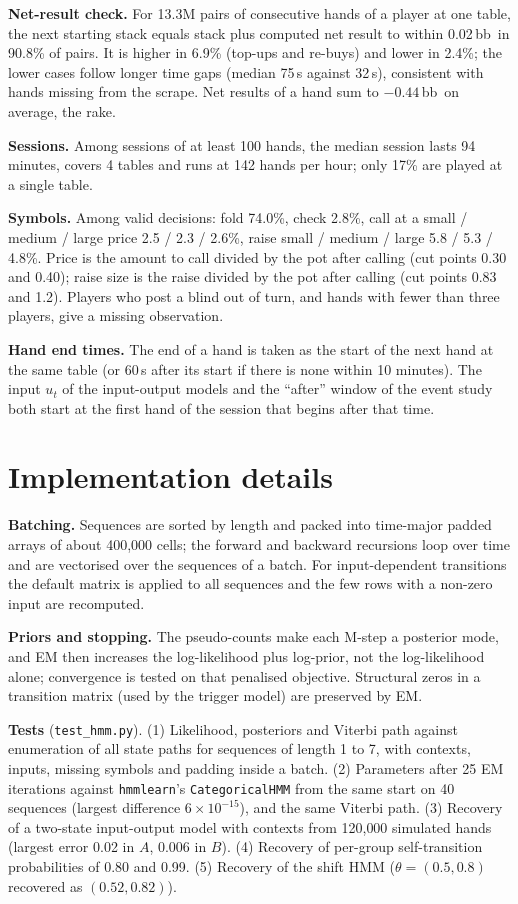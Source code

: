 \documentclass{article}
\newcommand{\bb}{\,bb}
\begin{document}
\textbf{Net-result check.} For 13.3M pairs of consecutive hands of a player at one table, the next starting stack equals stack plus computed net result to within 0.02\bb\ in 90.8\% of pairs. It is higher in 6.9\% (top-ups and re-buys) and lower in 2.4\%; the lower cases follow longer time gaps (median 75\,s against 32\,s), consistent with hands missing from the scrape. Net results of a hand sum to $-0.44$\bb\ on average, the rake.

\textbf{Sessions.} Among sessions of at least 100 hands, the median session lasts 94 minutes, covers 4 tables and runs at 142 hands per hour; only 17\% are played at a single table.

\textbf{Symbols.} Among valid decisions: fold 74.0\%, check 2.8\%, call at a small / medium / large price 2.5 / 2.3 / 2.6\%, raise small / medium / large 5.8 / 5.3 / 4.8\%. Price is the amount to call divided by the pot after calling (cut points 0.30 and 0.40); raise size is the raise divided by the pot after calling (cut points 0.83 and 1.2). Players who post a blind out of turn, and hands with fewer than three players, give a missing observation.

\textbf{Hand end times.} The end of a hand is taken as the start of the next hand at the same table (or 60\,s after its start if there is none within 10 minutes). The input $u_t$ of the input-output models and the ``after'' window of the event study both start at the first hand of the session that begins after that time.

\section{Implementation details}
\label{app:impl}
\textbf{Batching.} Sequences are sorted by length and packed into time-major padded arrays of about 400{,}000 cells; the forward and backward recursions loop over time and are vectorised over the sequences of a batch. For input-dependent transitions the default matrix is applied to all sequences and the few rows with a non-zero input are recomputed.

\textbf{Priors and stopping.} The pseudo-counts make each M-step a posterior mode, and EM then increases the log-likelihood plus log-prior, not the log-likelihood alone; convergence is tested on that penalised objective. Structural zeros in a transition matrix (used by the trigger model) are preserved by EM.

\textbf{Tests} (\texttt{test\_hmm.py}). (1) Likelihood, posteriors and Viterbi path against enumeration of all state paths for sequences of length 1 to 7, with contexts, inputs, missing symbols and padding inside a batch. (2) Parameters after 25 EM iterations against \texttt{hmmlearn}'s \texttt{CategoricalHMM} from the same start on 40 sequences (largest difference $6\times10^{-15}$), and the same Viterbi path. (3) Recovery of a two-state input-output model with contexts from 120{,}000 simulated hands (largest error 0.02 in $A$, 0.006 in $B$). (4) Recovery of per-group self-transition probabilities of 0.80 and 0.99. (5) Recovery of the shift HMM ($\theta=(0.5,0.8)$ recovered as $(0.52,0.82)$).
\end{document}
